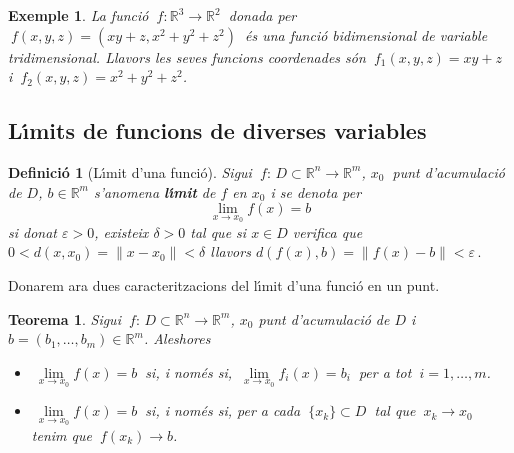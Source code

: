\documentclass[12pt]{article}
\newtheorem{definicio}{Definici{\'o}}[subsection]
\newtheorem{teorema}{Teorema}[subsection]
\newtheorem{exemple}{Exemple}[subsection]
\newcommand{\R}{\mathbb{R}}
\begin{document}
\vspace{0.4cm}
\begin{exemple}


La funci{\'o} $\ f:\R^3 \longrightarrow\R^2\ $ donada
per $\ f(x,y,z)=(xy+z,x^2+y^2+z^2)\ $ {\'e}s una funci{\'o} bidimensional
de variable tridimensional. Llavors les seves funcions  coordenades
  s{\'o}n $\ f_1(x,y,z)= xy+z\ $ i  $\ f_2(x,y,z)=x^2+y^2+z^2$.

\end{exemple}


\subsection{L{\'\i}mits  de funcions de diverses variables}


\begin{definicio}[L{\'\i}mit d'una funci{\'o}]
Sigui $\ f :\, D\subset \R^n \longrightarrow \R^m$, $x_0\ $ punt
d'acumulaci{\'o} de $D$, $b\in\R^m$ s'anomena \textbf{l{\'\i}mit} de $f$ en
$x_0$  i se denota per
$$\lim\limits_{x\to x_0} f(x)=b$$
si donat $\varepsilon > 0$, existeix $\delta > 0$ tal que si $x\in D$ verifica que $0 < d(x,x_0)=\| x-x_0\|< \delta$ llavors
$d(f(x),b)=\|
f(x) -b\| < \varepsilon\,.$
\end{definicio}

Donarem ara dues caracteritzacions del l{\'\i}mit d'una funci{\'o}
en un punt.

\vspace{0.4cm}
\begin{teorema}\label{lim}
Sigui $\ f :\, D\subset \R^n \longrightarrow \R^m$, $x_0$ punt
d'acumulaci{\'o} de $D$ i $b=(b_1,\ldots ,b_m)\in\R^m$.
Aleshores
\begin{itemize}
\item[a)] $\ \lim\limits_{x\to x_0} f(x)=b\ $ si, i nom{\'e}s si,
$\ \lim\limits_{x\to x_0} f_i(x)=b_i\ $ per a tot $\ i=1,\ldots , m$.
\item[b)]  $\ \lim\limits_{x\to x_0} f(x)=b\ $ si, i nom{\'e}s si, per a
cada $\ \{x_k\}\subset D\ $ tal que $\ x_k\to x_0\ $ tenim que $\ f(x_k)\to
b$.
\end{itemize}
\end{teorema}
\end{document}
